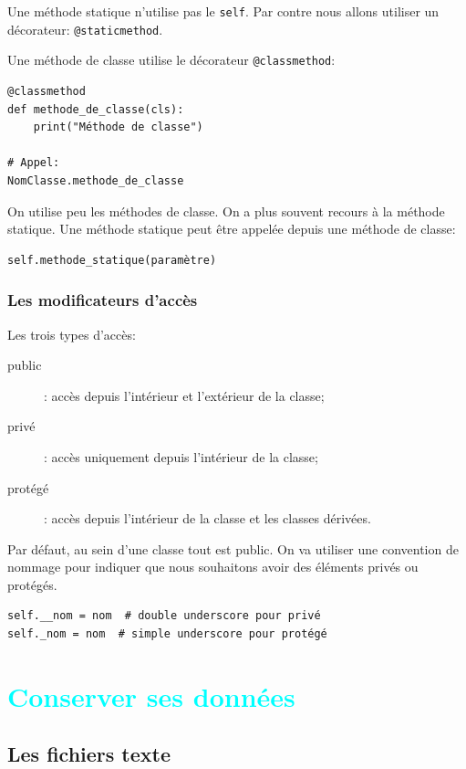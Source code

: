 \documentclass[a4paper,11pt]{book}
\begin{document}
Une méthode statique n'utilise pas le \texttt{self}. Par contre nous allons utiliser un décorateur: \texttt{@staticmethod}.

Une méthode de classe utilise le décorateur \texttt{@classmethod}:
\begin{lstlisting}
@classmethod
def methode_de_classe(cls):
    print("Méthode de classe")

# Appel:
NomClasse.methode_de_classe
\end{lstlisting}
\medskip

On utilise peu les méthodes de classe. On a plus souvent recours à la méthode statique. Une méthode statique peut être appelée depuis une méthode de classe:
\begin{lstlisting}
self.methode_statique(paramètre)
\end{lstlisting}
\medskip

\section{Les modificateurs d'accès}
Les trois types d'accès:
\begin{description}
	\item[public]: accès depuis l'intérieur et l'extérieur de la classe;
	\item[privé]: accès uniquement depuis l'intérieur de la classe;
	\item[protégé]: accès depuis l'intérieur de la classe et les classes dérivées.
\end{description}
\medskip

Par défaut, au sein d'une classe tout est public. On va utiliser une convention de nommage pour indiquer que nous souhaitons avoir des éléments privés ou protégés.
\begin{lstlisting}
self.__nom = nom  # double underscore pour privé
self._nom = nom  # simple underscore pour protégé
\end{lstlisting}
\medskip

\part{\textcolor{cyan}{Conserver ses données}}

\chapter{Les fichiers texte}
\end{document}
